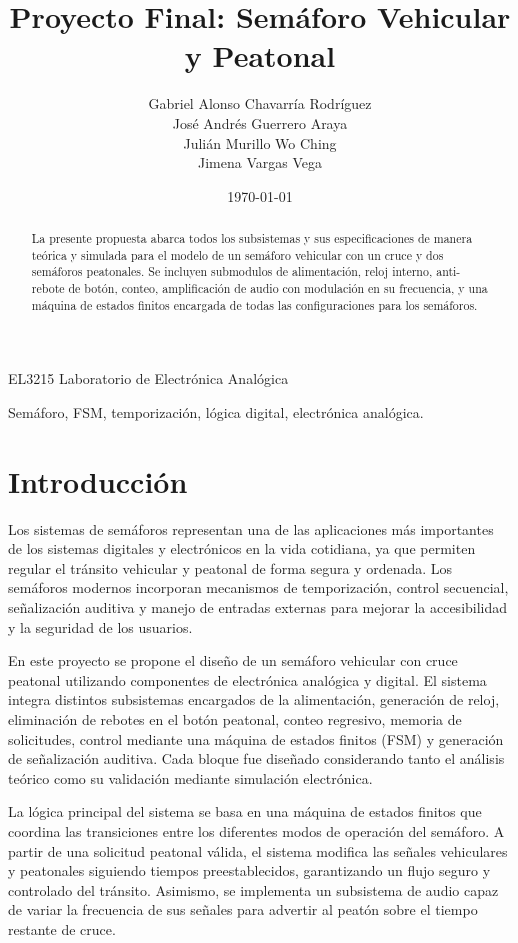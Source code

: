\documentclass[12pt,onecolumn]{IEEEtran}
\title{Proyecto Final: Semáforo Vehicular y Peatonal}
\author{
Gabriel Alonso Chavarría Rodríguez\\
José Andrés Guerrero Araya\\
Julián Murillo Wo Ching\\
Jimena Vargas Vega
}
\date{\today}
\begin{document}
%
{EL3215 Laboratorio de Electrónica Analógica}

\maketitle

\begin{abstract}
La presente propuesta abarca todos los subsistemas y sus especificaciones de manera teórica y simulada para el modelo de un semáforo vehicular con un cruce y dos semáforos peatonales. Se incluyen submodulos de alimentación, reloj interno, anti-rebote de botón, conteo, amplificación de audio con modulación en su frecuencia, y una máquina de estados finitos encargada de todas las configuraciones para los semáforos. 
\end{abstract}

\begin{IEEEkeywords}
Semáforo, FSM, temporización, lógica digital, electrónica analógica.
\end{IEEEkeywords}

\section{Introducción}

Los sistemas de semáforos representan una de las aplicaciones más importantes de los sistemas digitales y electrónicos en la vida cotidiana, ya que permiten regular el tránsito vehicular y peatonal de forma segura y ordenada. Los semáforos modernos incorporan mecanismos de temporización, control secuencial, señalización auditiva y manejo de entradas externas para mejorar la accesibilidad y la seguridad de los usuarios.

En este proyecto se propone el diseño de un semáforo vehicular con cruce peatonal utilizando componentes de electrónica analógica y digital. El sistema integra distintos subsistemas encargados de la alimentación, generación de reloj, eliminación de rebotes en el botón peatonal, conteo regresivo, memoria de solicitudes, control mediante una máquina de estados finitos (FSM) y generación de señalización auditiva. Cada bloque fue diseñado considerando tanto el análisis teórico como su validación mediante simulación electrónica.

La lógica principal del sistema se basa en una máquina de estados finitos que coordina las transiciones entre los diferentes modos de operación del semáforo. A partir de una solicitud peatonal válida, el sistema modifica las señales vehiculares y peatonales siguiendo tiempos preestablecidos, garantizando un flujo seguro y controlado del tránsito. Asimismo, se implementa un subsistema de audio capaz de variar la frecuencia de sus señales para advertir al peatón sobre el tiempo restante de cruce.
\end{document}
